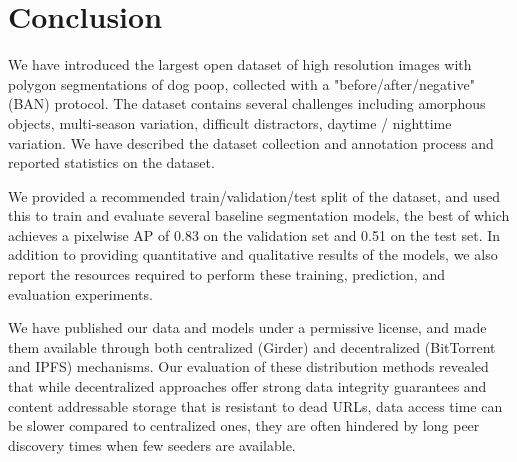 \documentclass[10pt,twocolumn,letterpaper]{article}
\begin{document}





\section{Conclusion}

We have introduced the largest open dataset of high resolution images with polygon
  segmentations of dog poop, collected with a "before/after/negative" (BAN) protocol.
The dataset contains several challenges including amorphous objects, multi-season variation, difficult
  distractors, daytime / nighttime variation.
We have described the dataset collection and annotation process and reported statistics on the dataset.

We provided a recommended train/validation/test split of the dataset, and used this to train and evaluate
  several baseline segmentation models, the best of which achieves a pixelwise AP of 0.83 on the validation
  set and 0.51 on the test set.
In addition to providing quantitative and qualitative results of the models, we also report the resources
  required to perform these training, prediction, and evaluation experiments.

We have published our data and models under a permissive license, and made them available through both
  centralized (Girder) and decentralized (BitTorrent and IPFS) mechanisms.
Our evaluation of these distribution methods revealed that while decentralized approaches offer strong data
  integrity guarantees and content addressable storage that is resistant to dead URLs, data access time can be
  slower compared to centralized ones, they are often hindered by long peer discovery times when few seeders
  are available.
\end{document}
